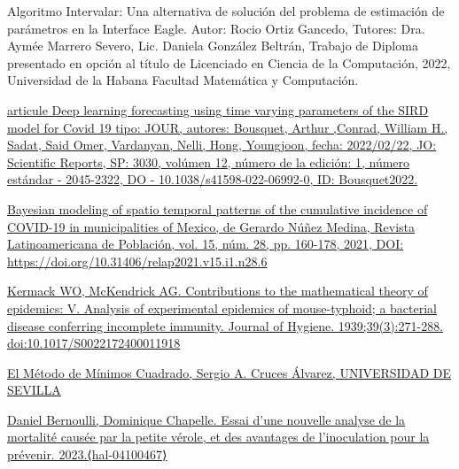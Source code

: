 \printbibliography[heading=bibintoc]

\label{sec:21}

\begin{itemize}

    \begin{thebibliography}

      {Algoritmo Intervalar: Una alternativa de solución del problema de estimación de parámetros en la Interface Eagle. Autor: Rocio Ortiz Gancedo, Tutores: Dra. Aymée Marrero Severo, Lic. Daniela González Beltrán, Trabajo de Diploma presentado en opción al título de Licenciado en Ciencia de la Computación, 2022, Universidad de la Habana Facultad Matemática y Computación.}
     \label{sec:1}

    \bibitem[2]{}\href{https://doi.org/10.1038/s41598-022-06992-0}{ articule Deep learning forecasting using time varying parameters of the SIRD model for Covid 19 tipo: JOUR, autores: Bousquet, Arthur ,Conrad, William H., Sadat, Said Omer, Vardanyan, Nelli, Hong, Youngjoon, fecha: 2022/02/22, JO: Scientific Reports, SP: 3030, volúmen 12, número de la edición: 1, número estándar   - 2045-2322, DO  - 10.1038/s41598-022-06992-0, ID: Bousquet2022.}
     \label{sec:2}

    \bibitem[3]{}  \href{https://www.redalyc.org/journal/3238/323864536006/html/}{Bayesian modeling of spatio temporal patterns of the cumulative incidence of COVID-19 in municipalities of Mexico, de Gerardo Núñez Medina, \href{https://revistarelap.org/index.php/relap}{ Revista Latinoamericana de Población}, vol. 15, núm. 28, pp. 160-178, 2021, DOI:  https://doi.org/10.31406/relap2021.v15.i1.n28.6}
      \label{sec:3}

    \bibitem[4]{}\href{https://www.semanticscholar.org/paper/Contributions-to-the-mathematical-theory-of-V.-of-a-Kermack-Mckendrick/7beba9b40b692c2daa9975861394aefddcbe602b}{ Kermack WO, McKendrick AG. Contributions to the mathematical theory of epidemics: V. Analysis of experimental epidemics of mouse-typhoid; a bacterial disease conferring incomplete immunity. Journal of Hygiene. 1939;39(3):271-288. doi:10.1017/S0022172400011918}
\label{sec:4}

    \bibitem[5]{}\href{https://personal.us.es/sergio/PDocente/lectura.pdf}{El Método de Mínimos Cuadrado, Sergio A. Cruces Álvarez, UNIVERSIDAD DE SEVILLA}
     \label{sec:5}

    \bibitem[6]{}\href{https://inria.hal.science/hal-04100467}{Daniel Bernoulli, Dominique Chapelle. Essai d'une nouvelle analyse de la mortalité causée par la petite vérole, et des avantages de l'inoculation pour la prévenir. 2023.⟨hal-04100467⟩}
\label{sec:6}


\end{thebibliography}
\end{itemize}
